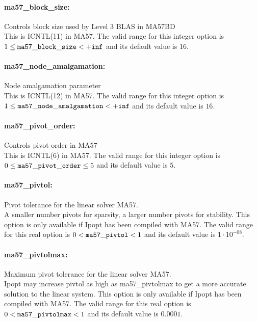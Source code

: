 \paragraph{ma57\_block\_size:}\label{sec:ma57_block_size} Controls block size used by Level 3 BLAS in MA57BD $\;$ \\
 This is ICNTL(11) in MA57. The valid range for this integer option is
$1 \le {\tt ma57\_block\_size } <  {\tt +inf}$
and its default value is $16$.


\paragraph{ma57\_node\_amalgamation:}\label{sec:ma57_node_amalgamation} Node amalgamation parameter $\;$ \\
 This is ICNTL(12) in MA57. The valid range for this integer option is
$1 \le {\tt ma57\_node\_amalgamation } <  {\tt +inf}$
and its default value is $16$.


\paragraph{ma57\_pivot\_order:}\label{sec:ma57_pivot_order} Controls pivot order in MA57 $\;$ \\
 This is ICNTL(6) in MA57. The valid range for this integer option is
$0 \le {\tt ma57\_pivot\_order } \le 5$
and its default value is $5$.


\paragraph{ma57\_pivtol:}\label{sec:ma57_pivtol} Pivot tolerance for the linear solver MA57. $\;$ \\
 A smaller number pivots for sparsity, a larger
number pivots for stability. This option is only
available if Ipopt has been compiled with MA57. The valid range for this real option is 
$0 <  {\tt ma57\_pivtol } <  1$
and its default value is $1 \cdot 10^{-08}$.


\paragraph{ma57\_pivtolmax:}\label{sec:ma57_pivtolmax} Maximum pivot tolerance for the linear solver MA57. $\;$ \\
 Ipopt may increase pivtol as high as
ma57\_pivtolmax to get a more accurate solution
to the linear system.  This option is only
available if Ipopt has been compiled with MA57. The valid range for this real option is 
$0 <  {\tt ma57\_pivtolmax } <  1$
and its default value is $0.0001$.


